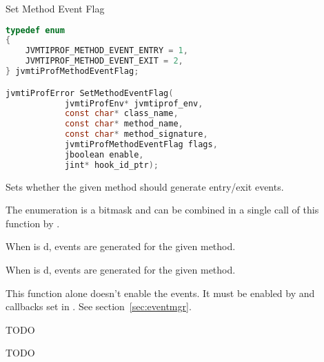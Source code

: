 \begin{apidef}{Set Method Event Flag}
\begin{lstlisting}[language=C]
typedef enum
{
    JVMTIPROF_METHOD_EVENT_ENTRY = 1,
    JVMTIPROF_METHOD_EVENT_EXIT = 2,
} jvmtiProfMethodEventFlag;

jvmtiProfError SetMethodEventFlag(
            jvmtiProfEnv* jvmtiprof_env,
            const char* class_name,
            const char* method_name,
            const char* method_signature,
            jvmtiProfMethodEventFlag flags,
            jboolean enable,
            jint* hook_id_ptr);
\end{lstlisting}


\begin{apidesc}
Sets whether the given method should generate entry/exit events.

The  enumeration is a bitmask and can be combined in a single call of this function by .

When  is d,  events are generated for the given method.

When  is d,  events are generated for the given method.

This function alone doesn't enable the events. It must be enabled by  and callbacks set in . See section~\ref{sec:eventmgr}.

\end{apidesc}

\begin{apiphase}
TODO
\end{apiphase}

\begin{apicap}
TODO
\end{apicap}

\begin{apiparam}
\end{apiparam}

\apireturnempty

\begin{apierror}
\end{apierror}
\end{apidef}
